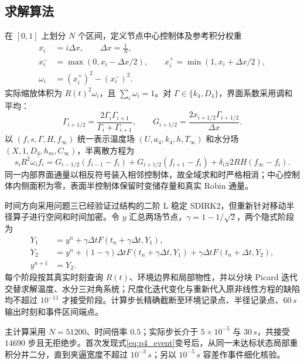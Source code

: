 \documentclass[withoutpreface,bwprint]{cumcmthesis}
\begin{document}
\subsection{求解算法}

在 $[0,1]$ 上划分 $N$ 个区间，定义节点中心控制体及参考积分权重
\begin{equation}
\begin{aligned}
x_i&=i\Delta x,\qquad \Delta x=\frac1N,\\
x_i^-&=\max(0,x_i-\Delta x/2),\qquad
x_i^+=\min(1,x_i+\Delta x/2),\\
\omega_i&=(x_i^+)^2-(x_i^-)^2.
\end{aligned}
\label{eq:p4_grid}
\end{equation}
实际缩放体积为 $R(t)^2\omega_i$，且 $\sum_i\omega_i=1$。对 $\Gamma\in\{k_4,D_4\}$，界面系数采用调和平均：
\begin{equation}
\Gamma_{i+1/2}=\frac{2\Gamma_i\Gamma_{i+1}}{\Gamma_i+\Gamma_{i+1}},\qquad
G_{i+1/2}=\frac{2x_{i+1/2}\Gamma_{i+1/2}}{\Delta x}.
\label{eq:p4_conductance}
\end{equation}
以 $(f,s,\Gamma,H,f_\infty)$ 统一表示温度场 $(U,a_4,k_4,h,T_\infty)$ 和水分场 $(X,1,D_4,h_m,C_\infty)$，半离散方程为
\begin{equation}
s_iR^2\omega_i\dot f_i
=G_{i-1/2}(f_{i-1}-f_i)+G_{i+1/2}(f_{i+1}-f_i)
+\delta_{iN}2RH(f_\infty-f_i).
\label{eq:p4_semidiscrete}
\end{equation}
同一内部界面通量以相反符号装入相邻控制体，故全域求和时严格相消；中心控制体内侧面积为零，表面半控制体保留时变储存量和真实 Robin 通量。

时间方向采用问题三已经验证过结构的二阶 L 稳定 SDIRK2，但重新针对移动半径算子进行空间和时间加密。令 $y$ 汇总两场节点，$\gamma=1-1/\sqrt2$，两个隐式阶段为
\begin{equation}
\begin{aligned}
Y_1&=y^n+\gamma\Delta t F(t_n+\gamma\Delta t,Y_1),\\
Y_2&=y^n+(1-\gamma)\Delta t F(t_n+\gamma\Delta t,Y_1)
      +\gamma\Delta t F(t_n+\Delta t,Y_2),\\
y^{n+1}&=Y_2.
\end{aligned}
\label{eq:p4_sdirk}
\end{equation}
每个阶段按其真实时刻查询 $R(t)$、环境边界和局部物性，并以分块 Picard 迭代交替求解温度、水分三对角系统；尺度化迭代变化与重新代入原非线性方程的缺陷均不超过 $10^{-11}$ 才接受阶段。计算步长精确截断至环境记录点、半径记录点、$60\,\si{s}$ 输出时刻和事件区间端点。

主计算采用 $N=51200$、时间倍率 $0.5$；实际步长介于 $5\times10^{-5}$ 与 $30\,\si{s}$，共接受 $14690$ 步且无拒绝步。首次发现式\eqref{eq:p4_event}变号后，从同一未达标状态局部重积分并二分，直到夹逼宽度不超过 $10^{-3}\,\si{s}$；另以 $10^{-5}\,\si{s}$ 容差作事件细化核验。
\end{document}
